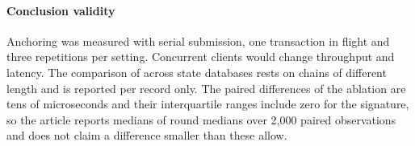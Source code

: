 \paragraph{Conclusion validity} Anchoring was measured with serial submission, one transaction in flight and three repetitions per setting. Concurrent clients would change throughput and latency. The comparison of  across state databases rests on chains of different length and is reported per record only. The paired differences of the ablation are tens of microseconds and their interquartile ranges include zero for the signature, so the article reports medians of round medians over 2,000 paired observations and does not claim a difference smaller than these allow.
